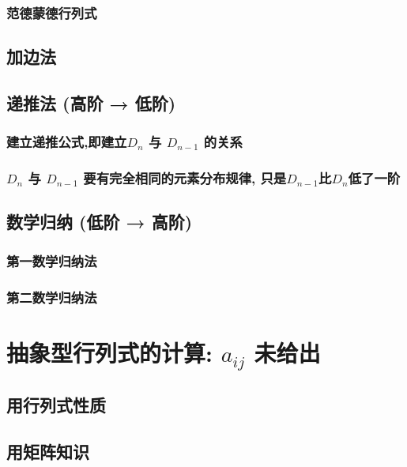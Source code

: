 \documentclass[UTF8]{ctexart}
\begin{document}
		\subsubsection{范德蒙德行列式}
	
	\subsection{加边法}
	
	\subsection{递推法 (高阶 → 低阶)}
	
		\subsubsection{建立递推公式,即建立$D_n$ 与 $D_{n-1}$ 的关系}
		
		\subsubsection{$D_n$ 与 $D_{n-1}$ 要有完全相同的元素分布规律, 只是$D_{n-1}$比$D_n$低了一阶 }
	
	
	\subsection{数学归纳 (低阶 → 高阶)}
	
		\subsubsection{第一数学归纳法}
		
		\subsubsection{第二数学归纳法}
	
	
	\section{抽象型行列式的计算: $a_{ij}$ 未给出	}
	
		\subsection{用行列式性质}
		
		\subsection{用矩阵知识}
		
\end{document}
